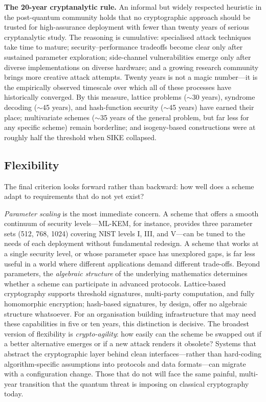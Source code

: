 \begin{svgraybox}
\textbf{The 20-year cryptanalytic rule.}
An informal but widely respected heuristic in the post-quantum community holds that no cryptographic approach should be trusted for high-assurance deployment with fewer than twenty years of serious cryptanalytic study.  The reasoning is cumulative: specialised attack techniques take time to mature; security--performance tradeoffs become clear only after sustained parameter exploration; side-channel vulnerabilities emerge only after diverse implementations on diverse hardware; and a growing research community brings more creative attack attempts.  Twenty years is not a magic number---it is the empirically observed timescale over which all of these processes have historically converged.  By this measure, lattice problems ($\sim$30 years), syndrome decoding ($\sim$45 years), and hash-function security ($\sim$45 years) have earned their place; multivariate schemes ($\sim$35 years of the general problem, but far less for any specific scheme) remain borderline; and isogeny-based constructions were at roughly half the threshold when SIKE collapsed.
\end{svgraybox}

\subsection{Flexibility}
\label{subsec:eval-flexibility}

The final criterion looks forward rather than backward: how well does a scheme adapt to requirements that do not yet exist?

\emph{Parameter scaling} is the most immediate concern.  A scheme that offers a smooth continuum of security levels---ML-KEM, for instance, provides three parameter sets (512, 768, 1024) covering NIST levels I, III, and V---can be tuned to the needs of each deployment without fundamental redesign.  A scheme that works at a single security level, or whose parameter space has unexplored gaps, is far less useful in a world where different applications demand different trade-offs.  Beyond parameters, the \emph{algebraic structure} of the underlying mathematics determines whether a scheme can participate in advanced protocols.  Lattice-based cryptography supports threshold signatures, multi-party computation, and fully homomorphic encryption; hash-based signatures, by design, offer no algebraic structure whatsoever.  For an organisation building infrastructure that may need these capabilities in five or ten years, this distinction is decisive.  The broadest version of flexibility is \emph{crypto-agility}: how easily can the scheme be swapped out if a better alternative emerges or if a new attack renders it obsolete?  Systems that abstract the cryptographic layer behind clean interfaces---rather than hard-coding algorithm-specific assumptions into protocols and data formats---can migrate with a configuration change.  Those that do not will face the same painful, multi-year transition that the quantum threat is imposing on classical cryptography today.

